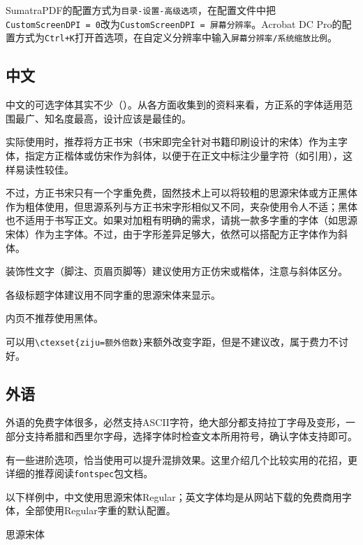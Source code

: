 \documentclass[10pt,openany]{book}
\begin{document}
\begin{sloppypar}
    SumatraPDF的配置方式为\texttt{目录-设置-高级选项}，在配置文件中把\texttt{CustomScreenDPI\ =\ 0}改为\texttt{CustomScreenDPI\ =\ 屏幕分辨率}。Acrobat DC Pro的配置方式为\texttt{Ctrl+K}打开首选项，在自定义分辨率中输入\texttt{屏幕分辨率/系统缩放比例}。

    \subsection{中文}

    中文的可选字体其实不少（）。从各方面收集到的资料来看，方正系的字体适用范围最广、知名度最高，设计应该是最佳的。

    实际使用时，推荐将方正书宋（书宋即完全针对书籍印刷设计的宋体）作为主字体，指定方正楷体或仿宋作为斜体，以便于在正文中标注少量字符（如引用），这样易读性较佳。

    不过，方正书宋只有一个字重免费，固然技术上可以将较粗的思源宋体或方正黑体作为粗体使用，但思源系列与方正书宋字形相似又不同，夹杂使用令人不适；黑体也不适用于书写正文。如果对加粗有明确的需求，请挑一款多字重的字体（如思源宋体）作为主字体。不过，由于字形差异足够大，依然可以搭配方正字体作为斜体。

    装饰性文字（脚注、页眉页脚等）建议使用方正仿宋或楷体，注意与斜体区分。

    各级标题字体建议用不同字重的思源宋体来显示。

    内页不推荐使用黑体。

    可以用\texttt{\textbackslash{}ctexset\{ziju=额外倍数\}}来额外改变字距，但是不建议改，属于费力不讨好。

    \subsection{外语}

    外语的免费字体很多，必然支持ASCII字符，绝大部分都支持拉丁字母及变形，一部分支持希腊和西里尔字母，选择字体时检查文本所用符号，确认字体支持即可。

    有一些进阶选项，恰当使用可以提升混排效果。这里介绍几个比较实用的花招，更详细的推荐阅读\texttt{fontspec}包文档。

    以下样例中，中文使用思源宋体Regular；英文字体均是从网站下载的免费商用字体，全部使用Regular字重的默认配置。

    \begin{adjustwidth}{2em}{2em}
        \large\blankpar

        思源宋体\testtext


\end{adjustwidth}
\end{sloppypar}
\end{document}
